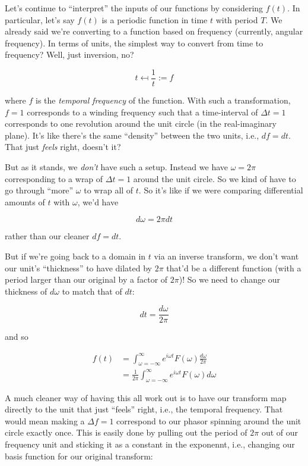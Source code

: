 \documentclass[../main/main.tex]{subfiles}
\begin{document}
Let's continue to ``interpret'' the inputs of our functions
by considering \(f(t)\). In particular, let's say \(f(t)\)
is a periodic function in time \(t\) with period \(T\). 
We already said we're converting to a function based
on frequency (currently, angular frequency).
In terms of units,
the simplest way to convert from time to frequency?
Well, just inversion, no?

\[t \mapsfrom \frac{1}{t} := f \]

where \(f\) is the \emph{temporal frequency} of the function.
With such a transformation, \(f=1\) corresponds to
a winding frequency such that a time-interval
of \(\Delta t = 1\) corresponds to one revolution around
the unit circle (in the real-imaginary plane).
It's like there's the same ``density'' between the two units,
i.e., \(df = dt\).
That just \emph{feels} right, doesn't it?
\par

But as it stands, we \emph{don't} have such a setup.
Instead we have \(\omega = 2\pi\) corresponding to
a wrap of \(\Delta t = 1\) around the unit circle.
So we kind of have to go through ``more'' \(\omega\)
to wrap all of \(t\). 
So it's like if we were comparing
differential amounts of \(t\) with \(\omega\), we'd have

\[d\omega = 2\pi dt\]

rather than our cleaner \(df = dt\).\par
But if we're going back to a domain in \(t\) 
via an inverse transform, we don't
want our unit's ``thickness'' to have dilated by \(2\pi\)
\textemdash{} that'd be a different function (with a period
larger than our original by a factor of \(2\pi\))!
So we need to change our thickness of \(d\omega\) to match
that of \(dt\):

\[  dt = \frac{d\omega}{2\pi} \]

and so

\[\begin{split}
  f(t) &=
  \int_{\omega=-\infty}^{\infty} e^{i\omega t} F(\omega) \frac{d\omega}{2\pi} \\
  &= \frac{1}{2\pi}\int_{\omega=-\infty}^{\infty} e^{i\omega t} F(\omega) d\omega
\end{split}\]

A much cleaner way of having this all work out
is to have our transform map directly to the unit that just
``feels'' right, i.e., the temporal frequency.
That would mean making a \(\Delta f = 1\) correspond to
our phasor spinning around the unit circle exactly once.
This is easily done by pulling out the period of \(2\pi\)
out of our frequency unit and sticking it as a constant
in the exponennt, i.e., changing our basis function
for our original transform:
\end{document}
